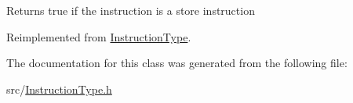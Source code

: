 Returns true if the instruction is a store instruction 

Reimplemented from \hyperlink{classInstructionType_aa81de3619fb9d88f52d7d8104f9ac188}{Instruction\+Type}.



The documentation for this class was generated from the following file\+:\begin{DoxyCompactItemize}
\item 
src/\hyperlink{InstructionType_8h}{Instruction\+Type.\+h}\end{DoxyCompactItemize}
